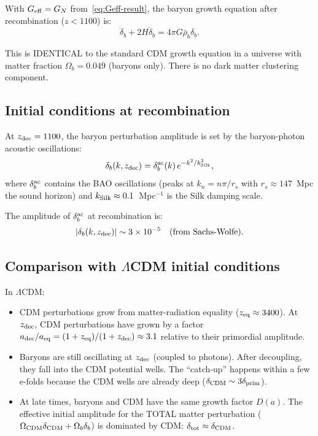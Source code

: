 \documentclass[aps,prd,twocolumn,nofootinbib]{revtex4-2}
\newcommand{\ee}[1]{\times 10^{#1}}
\newcommand{\LCDM}{$\Lambda$CDM}
\newcommand{\Geff}{G_{\rm eff}}
\newcommand{\kSilk}{k_{\rm Silk}}
\begin{document}
With $\Geff = G_N$ from~\eqref{eq:Geff-result}, the baryon growth
equation after recombination ($z < 1100$) is:
\begin{equation}
\ddot\delta_b + 2H\dot\delta_b = 4\pi G\bar\rho_b\delta_b.
\label{eq:baryon-growth-final}
\end{equation}

This is IDENTICAL to the standard CDM growth equation in a universe
with matter fraction $\Omega_b = 0.049$ (baryons only). There is no
dark matter clustering component.

\subsection{Initial conditions at recombination}

At $z_{\rm dec} = 1100$, the baryon perturbation amplitude is set by
the baryon-photon acoustic oscillations:
\begin{equation}
\delta_b(k, z_{\rm dec}) = \delta_b^{\rm ac}(k)\,e^{-k^2/k_{\rm Silk}^2},
\end{equation}
where $\delta_b^{\rm ac}$ contains the BAO oscillations (peaks at
$k_n = n\pi/r_s$ with $r_s \approx 147$~Mpc the sound horizon) and
$\kSilk \approx 0.1$~Mpc$^{-1}$ is the Silk damping scale.

The amplitude of $\delta_b^{\rm ac}$ at recombination is:
\begin{equation}
|\delta_b(k, z_{\rm dec})| \sim 3\ee{-5}\quad
\text{(from Sachs-Wolfe)}.
\end{equation}

\subsection{Comparison with \LCDM{} initial conditions}

In \LCDM:
\begin{itemize}
\item CDM perturbations grow from matter-radiation equality
  ($z_{\rm eq} \approx 3400$). At $z_{\rm dec}$, CDM perturbations
  have grown by a factor $a_{\rm dec}/a_{\rm eq}
  = (1+z_{\rm eq})/(1+z_{\rm dec}) \approx 3.1$ relative to their
  primordial amplitude.
\item Baryons are still oscillating at $z_{\rm dec}$ (coupled to
  photons). After decoupling, they fall into the CDM potential wells.
  The ``catch-up'' happens within a few e-folds because the CDM wells
  are already deep ($\delta_{\rm CDM} \sim 3\delta_{\rm prim}$).
\item At late times, baryons and CDM have the same growth factor $D(a)$.
  The effective initial amplitude for the TOTAL matter perturbation
  ($\Omega_{\rm CDM}\delta_{\rm CDM} + \Omega_b\delta_b$) is dominated
  by CDM: $\delta_{\rm tot} \approx \delta_{\rm CDM}$.
\end{itemize}
\end{document}
